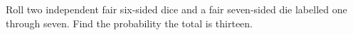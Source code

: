 Roll two independent fair six-sided dice and a fair seven-sided die labelled one through seven. Find the probability the total is thirteen.
